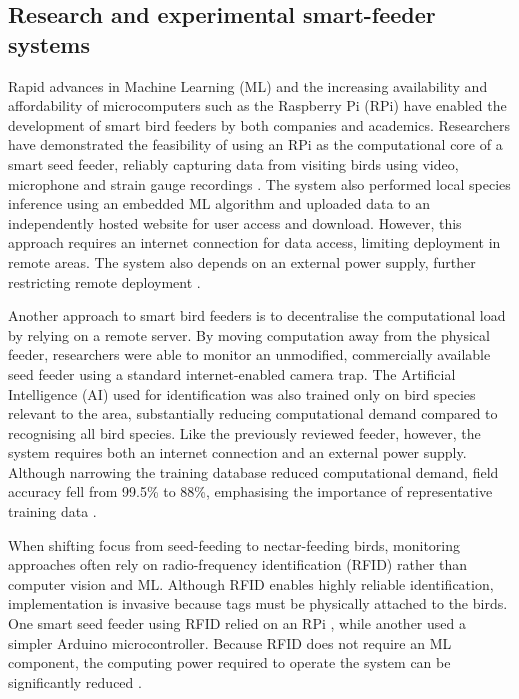 \subsection{Research and experimental smart-feeder systems}
Rapid advances in Machine Learning (ML) and the increasing availability and affordability of microcomputers such as the Raspberry Pi (RPi) have enabled the development of smart bird feeders by both companies and academics. Researchers have demonstrated the feasibility of using an RPi as the computational core of a smart seed feeder, reliably capturing data from visiting birds using video, microphone and strain gauge recordings \cite{NiersEtAl2022}. The system also performed local species inference using an embedded ML algorithm and uploaded data to an independently hosted website for user access and download. However, this approach requires an internet connection for data access, limiting deployment in remote areas. The system also depends on an external power supply, further restricting remote deployment \cite{NiersEtAl2022}.
\par\vspace{6pt}
Another approach to smart bird feeders is to decentralise the computational load by relying on a remote server. By moving computation away from the physical feeder, researchers were able to monitor an unmodified, commercially available seed feeder using a standard internet-enabled camera trap. The Artificial Intelligence (AI) used for identification was also trained only on bird species relevant to the area, substantially reducing computational demand compared to recognising all bird species. Like the previously reviewed feeder, however, the system requires both an internet connection and an external power supply. Although narrowing the training database reduced computational demand, field accuracy fell from 99.5\% to 88\%, emphasising the importance of representative training data \cite{Mansouri2025}.
\par\vspace{6pt}
When shifting focus from seed-feeding to nectar-feeding birds, monitoring approaches often rely on radio-frequency identification (RFID) rather than computer vision and ML. Although RFID enables highly reliable identification, implementation is invasive because tags must be physically attached to the birds. One smart seed feeder using RFID relied on an RPi \cite{Youngblood2019}, while another used a simpler Arduino microcontroller. Because RFID does not require an ML component, the computing power required to operate the system can be significantly reduced \cite{IbarraEtAl2015}.
\par\vspace{6pt}
